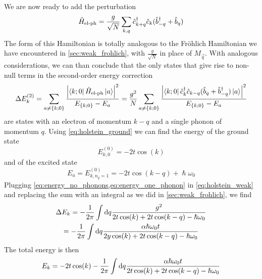 We are now ready to add the perturbation
\begin{equation}
    \hat{H}_\text{el-ph} = \frac{g}{\sqrt{N}}\sum_{k, q} \hat{c}^\dagger_{k+q} \hat{c}_k (\hat{b}^\dagger_{-q} + \hat{b}_q)
\end{equation}
The form of this Hamiltonian is totally analogous to the Fröhlich Hamiltonian we have encountered in \cref{sec:weak_frohlich}, with $\frac{g}{\sqrt{N}}$ in place of $M_\vec{q}$. With analogous considerations, we can than conclude that the only states that give rise to non-null terms in the second-order energy correction
\begin{equation} \label{eq:holstein_weak}
    \Delta E_k^{(2)} = \sum_{a\neq{\{k;0\}}} \frac{\left|\bra{k;0}\hat{H}_\text{el-ph}\ket{a}\right|^2}{E_{\{k;0\}} - E_a}
    = \frac{g^2}{N} \sum_{a\neq{\{k;0\}}} \frac{\left|\bra{k;0} \hat{c}^\dagger_{k}\hat{c}_{k-q} (\hat{b}_{q} + \hat{b}^\dagger_{-q})\ket{a}\right|^2}{E_{\{k;0\}} - E_a}
\end{equation}
are states with an electron of momentum $k-q$ and a single phonon of momentum $q$. Using \cref{eq:holstein_ground} we can find the energy of the ground state
\begin{equation} \label{eq:energy_no_phonons}
    E_{k, 0}^{(0)} = -2t \cos(k)
\end{equation}
and of the excited state
\begin{equation} \label{eq:energy_one_phonon}
    E_a = E_{k, n_q=1}^{(0)} = -2t \cos(k-q) + \hslash\omega_0
\end{equation}
Plugging \cref{eq:energy_no_phonons,eq:energy_one_phonon} in \cref{eq:holstein_weak} and replacing the sum with an integral as we did in \cref{sec:weak_frohlich}, we find
\begin{multline}
    \Delta E_k = -  \frac{1}{2\pi}\int \differential q \frac{g^2}{2t\cos(k) +2t\cos(k-q) - \hslash \omega_0}
    \\ = -  \frac{1}{2\pi}\int \differential q \frac{\alpha \hslash \omega_0 t}{2y\cos(k) +2t\cos(k-q) - \hslash \omega_0 }
\end{multline}
The total energy is then
\begin{equation}
    E_k = -2t\cos(k)  - \frac{1}{2\pi}\int \differential q \frac{\alpha \hslash \omega_0 t}{2t\cos(k) +2t\cos(k-q) - \hslash \omega_0 }
\end{equation}